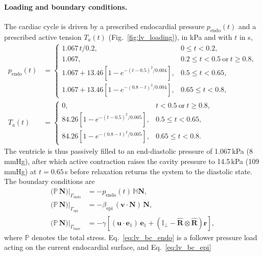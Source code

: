 \paragraph{Loading and boundary conditions.}
The cardiac cycle is driven by a prescribed endocardial pressure $p_{\mathrm{endo}}(t)$ and
a prescribed active tension $T_a(t)$ (Fig.~\ref{fig:lv_loading}), in kPa and with $t$ in s,
\begin{align}
  p_{\mathrm{endo}}(t)&=
  \begin{cases}
    1.067\,t/0.2, & 0\le t<0.2,\\
    1.067, & 0.2\le t<0.5 \ \text{or}\ t\ge 0.8,\\
    1.067+13.46\left[1-e^{-(t-0.5)^2/0.004}\right], & 0.5\le t<0.65,\\
    1.067+13.46\left[1-e^{-(0.8-t)^2/0.004}\right], & 0.65\le t<0.8,
  \end{cases}
  \label{eq:lv_loading}\\
  T_a(t)&=
  \begin{cases}
    0, & t<0.5 \ \text{or}\ t\ge 0.8,\\
    84.26\left[1-e^{-(t-0.5)^2/0.005}\right], & 0.5\le t<0.65,\\
    84.26\left[1-e^{-(0.8-t)^2/0.005}\right], & 0.65\le t<0.8.
  \end{cases}
  \label{eq:lv_active_tension}
\end{align}
The ventricle is thus passively filled to an end-diastolic pressure of 1.067\,kPa
(8\,mmHg), after which active contraction raises the cavity pressure to 14.5\,kPa
(109\,mmHg) at $t=0.65$\,s before relaxation returns the system to the diastolic state.
The boundary conditions are
\begin{align}
  \big(\mathbb{P}\,\mathbf{N}\big)\big|_{\Gamma_{\mathrm{endo}}} &= -p_{\mathrm{endo}}(t)\,\mathbb{H}\mathbf{N},
  \label{eq:lv_bc_endo}\\
  \big(\mathbb{P}\,\mathbf{N}\big)\big|_{\Gamma_{\mathrm{epi}}} &= -\beta_{\mathrm{epi}}\,(\mathbf{v}\cdot\mathbf{N})\,\mathbf{N},
  \label{eq:lv_bc_epi}\\
  \big(\mathbb{P}\,\mathbf{N}\big)\big|_{\Gamma_{\mathrm{base}}} &= -\gamma\left[(\mathbf{u}\cdot\mathbf{e}_1)\,\mathbf{e}_1
  + \left(\mathbb{I}_\perp-\hat{\mathbf{R}}\otimes\hat{\mathbf{R}}\right)\mathbf{r}\right],
  \label{eq:lv_bc_base}
\end{align}
where $\mathbb{P}$ denotes the total stress. Eq.~\eqref{eq:lv_bc_endo} is a follower
pressure load acting on the current endocardial surface, and Eq.~\eqref{eq:lv_bc_epi}
